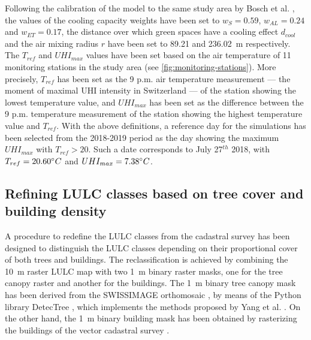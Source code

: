 \documentclass[10pt,letterpaper]{article}
\begin{document}
Following the calibration of the model to the same study area by Bosch et al. \cite{bosch2020spatially}, the values of the cooling capacity weights have been set to $w_{S} = 0.59$, $w_{AL} = 0.24$ and $w_{ET} = 0.17$, the distance over which green spaces have a cooling effect $d_{cool}$ and the air mixing radius $r$ have been set to 89.21 and 236.02~m respectively.
The $T_{ref}$ and $UHI_{max}$ values have been set based on the air temperature of 11 monitoring stations in the study area (see \autoref{fig:monitoring-stations}). More precisely, $T_{ref}$ has been set as the 9 p.m. air temperature measurement --- the moment of maximal UHI intensity in Switzerland \cite{burgst2019representing} --- of the station showing the lowest temperature value, and $UHI_{max}$ has been set as the difference between the 9 p.m. temperature measurement of the station showing the highest temperature value and $T_{ref}$.
With the above definitions, a reference day for the simulations has been selected from the 2018-2019 period as the day showing the maximum $UHI_{max}$ with $T_{ref} > 20$. Such a date corresponds to July 27$^{th}$ 2018, with $T_{ref} = 20.60 \degree C$ and $UHI_{max} = 7.38 \degree C$.


\subsection*{Refining LULC classes based on tree cover and building density}
\label{sec:refin-lulc-class}

A procedure to redefine the LULC classes from the cadastral survey has been designed to distinguish the LULC classes depending on their proportional cover of both trees and buildings. The reclassification is achieved by combining the 10~m raster LULC map with two 1~m binary raster masks, one for the tree canopy raster and another for the buildings. %
The 1~m binary tree canopy mask has been derived from the SWISSIMAGE orthomosaic \cite{swisstopo2019swissimage}, by means of the Python library DetecTree \cite{bosch2020detectree}, which implements the methods proposed by Yang et al. \cite{yang2009tree}. On the other hand, the 1~m binary building mask has been obtained by rasterizing the buildings of the vector cadastral survey \cite{asitvd2018structure}.
\end{document}
